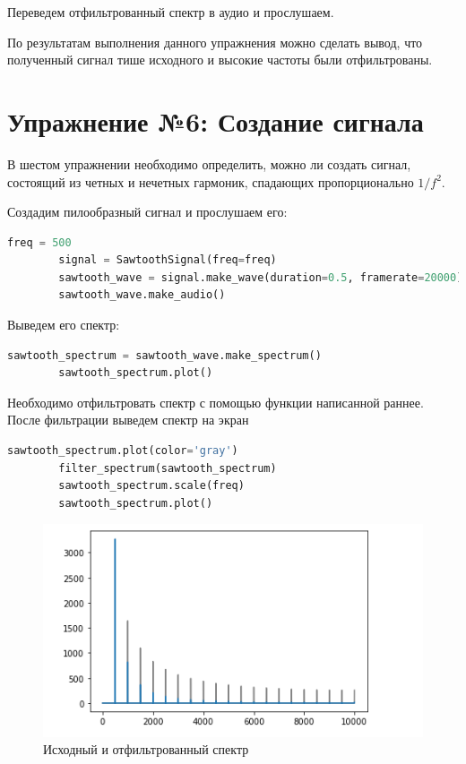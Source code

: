 \documentclass[a4paper, 14pt]{extarticle}
\begin{document}
    Переведем отфильтрованный спектр в аудио и прослушаем.

    По результатам выполнения данного упражнения можно сделать вывод, что полученный сигнал тише исходного и высокие частоты были отфильтрованы.


    \section{Упражнение №6: Создание сигнала}
    \label{sec:6_find_signal}

    В шестом упражнении необходимо определить, можно ли создать сигнал, состоящий из четных и нечетных гармоник, спадающих пропорционально \(1/f^2\).

    Создадим пилообразный сигнал и прослушаем его:

    \begin{lstlisting}[language=Python, caption= Создание пилообразного сигнала, label={lst:make_sawtooth_signal_audio}]
        freq = 500
        signal = SawtoothSignal(freq=freq)
        sawtooth_wave = signal.make_wave(duration=0.5, framerate=20000)
        sawtooth_wave.make_audio()
    \end{lstlisting}

    Выведем его спектр:

    \begin{lstlisting}[language=Python, caption= Спектр пилообразного сигнала, label={lst:sawtooth_spectrum_plot}]
        sawtooth_spectrum = sawtooth_wave.make_spectrum()
        sawtooth_spectrum.plot()
    \end{lstlisting}

    Необходимо отфильтровать спектр с помощью функции написанной раннее.
    После фильтрации выведем спектр на экран

    \begin{lstlisting}[language=Python, caption= Фильтрация и вывод спектра, label={lst:filter_spectrum_plot}]
        sawtooth_spectrum.plot(color='gray')
        filter_spectrum(sawtooth_spectrum)
        sawtooth_spectrum.scale(freq)
        sawtooth_spectrum.plot()
    \end{lstlisting}

    \begin{figure}[H]
        \centering
        \includegraphics[width=\textwidth]{sawtooth_filtered_spectrum}
        \caption{Исходный и отфильтрованный спектр}
        \label{fig:sawtooth_filtered_spectrum}
    \end{figure}
\end{document}
